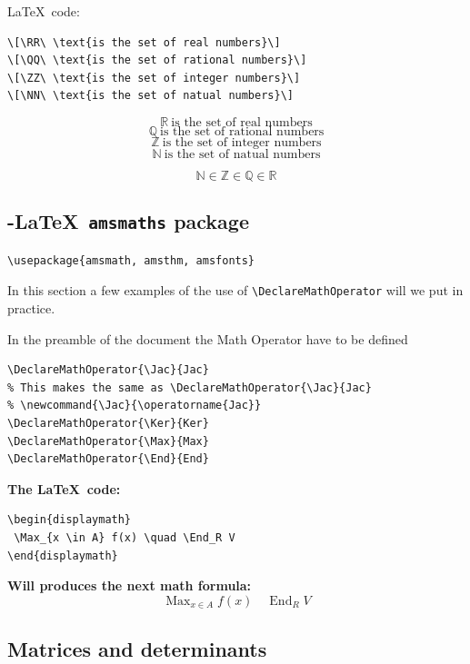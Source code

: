 \documentclass[12pt,a4paper]{article}
\theoremstyle{definition}
\theoremstyle{remark}
\def\RR{\mathbb{R}}
\def\ZZ{\mathbb{Z}}
\def\QQ{\mathbb{Q}}
\def\NN{\mathbb{N}}
\DeclareMathOperator{\Jac}{Jac}
\DeclareMathOperator{\Ker}{Ker}
\DeclareMathOperator{\Max}{Max}
\DeclareMathOperator{\End}{End}
\begin{document}
\LaTeX \ code:
\begin{verbatim}
\[\RR\ \text{is the set of real numbers}\]
\[\QQ\ \text{is the set of rational numbers}\]
\[\ZZ\ \text{is the set of integer numbers}\]
\[\NN\ \text{is the set of natual numbers}\]
\end{verbatim}


\[\RR\ \text{is the set of real numbers}\]
\[\QQ\ \text{is the set of rational numbers}\]
\[\ZZ\ \text{is the set of integer numbers}\]
\[\NN\ \text{is the set of natual numbers}\]

\[\NN \in \ZZ \in \QQ \in \RR\]


\subsection{\AmS-\LaTeX \texttt{ amsmaths} package}\label{sec:nothing}
\begin{verbatim}
\usepackage{amsmath, amsthm, amsfonts}
\end{verbatim}

In this section a few examples of the use of 
\verb|\DeclareMathOperator| will we put in practice.

In the preamble of the document the Math Operator have to be defined 
\begin{verbatim}
\DeclareMathOperator{\Jac}{Jac}
% This makes the same as \DeclareMathOperator{\Jac}{Jac}
% \newcommand{\Jac}{\operatorname{Jac}}
\DeclareMathOperator{\Ker}{Ker}
\DeclareMathOperator{\Max}{Max}
\DeclareMathOperator{\End}{End}
\end{verbatim}

\bigskip
\begin{minipage}[t]{0.55\textwidth}
\textbf{The \LaTeX \ code:}
\begin{verbatim}
\begin{displaymath}
 \Max_{x \in A} f(x) \quad \End_R V 
\end{displaymath}
\end{verbatim}
\end{minipage}
\vline\hfill
\begin{minipage}[t]{0.35\textwidth}
\textbf{Will produces the next math formula:}
\begin{displaymath}
 \Max_{x \in A} f(x) \quad \End_R V 
\end{displaymath}
\end{minipage}


\subsection{Matrices and determinants}
\end{document}
